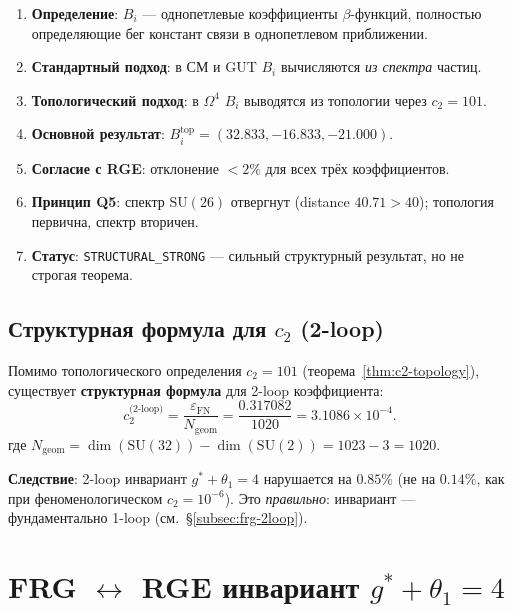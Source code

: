 \documentclass[11pt,a4paper]{article}
\newcommand{\SU}{\ensuremath{\mathrm{SU}}}
\newcommand{\Om}{\ensuremath{\Omega^4}}
\newcommand{\epsFN}{\ensuremath{\varepsilon_{\text{FN}}}}
\theoremstyle{definition}
\begin{document}
\begin{enumerate}
    \item \textbf{Определение}: $B_i$ --- однопетлевые коэффициенты
          $\beta$-функций, полностью определяющие бег констант
          связи в однопетлевом приближении.
    \item \textbf{Стандартный подход}: в СМ и GUT $B_i$ вычисляются
          \emph{из спектра} частиц.
    \item \textbf{Топологический подход}: в $\Om$ $B_i$ выводятся
          из топологии через $c_2 = 101$.
    \item \textbf{Основной результат}:
          $B_i^{\text{top}} = (32.833, -16.833, -21.000)$.
    \item \textbf{Согласие с RGE}: отклонение $< 2\%$
          для всех трёх коэффициентов.
    \item \textbf{Принцип Q5}: спектр $\SU(26)$ отвергнут
          (distance $40.71 > 40$); топология первична, спектр вторичен.
    \item \textbf{Статус}: \texttt{STRUCTURAL\_STRONG} ---
          сильный структурный результат, но не строгая теорема.
\end{enumerate}
\subsection{Структурная формула для \texorpdfstring{$c_2$}{c\_2} (2-loop)}
\label{subsec:c2-structural}

Помимо топологического определения $c_2 = 101$ (теорема~\ref{thm:c2-topology}),
существует \textbf{структурная формула} для 2-loop коэффициента:
\begin{equation}
    \boxed{
    c_2^{\text{(2-loop)}} = \frac{\epsFN}{N_{\text{geom}}}
    = \frac{0.317082}{1020} = 3.1086 \times 10^{-4}.
    }
    \label{eq:c2-structural}
\end{equation}
где $N_{\text{geom}} = \dim(\SU(32)) - \dim(\SU(2)) = 1023 - 3 = 1020$.

\medskip\noindent
\textbf{Следствие}: 2-loop инвариант $g^* + \theta_1 = 4$
нарушается на $0.85\%$ (не на $0.14\%$, как при феноменологическом
$c_2 = 10^{-6}$). Это \emph{правильно}: инвариант — фундаментально
1-loop (см.~\S\ref{subsec:frg-2loop}).

\section{FRG \texorpdfstring{$\leftrightarrow$}{to} RGE инвариант \texorpdfstring{$g^* + \theta_1 = 4$}{g* + theta1 = 4}}
\label{sec:frg-rge}
\end{document}
